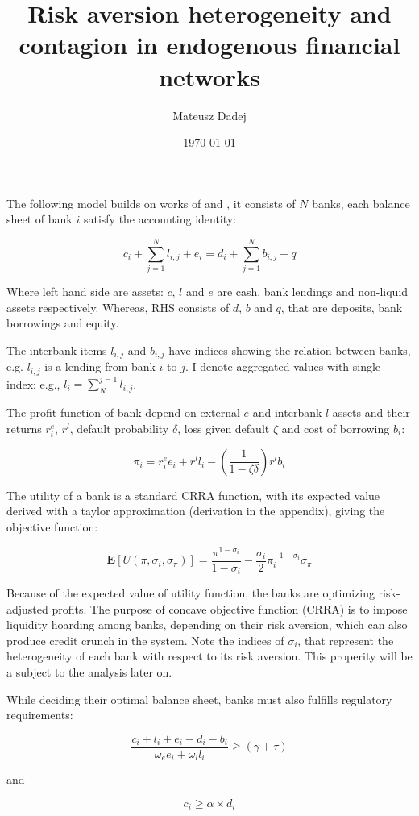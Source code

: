 \documentclass{article}
\title{Risk aversion heterogeneity and contagion in endogenous financial networks}
\author{Mateusz Dadej}
\date{\today}
\begin{document}
\maketitle


The following model builds on works of \citet{bluhm} and \citet{aldasoro}, it consists of $N$ banks, each balance sheet of bank $i$ satisfy the accounting identity:

\[c_i + \sum_{j=1}^{N}l_{i,j} + e_i = d_i + \sum_{j=1}^{N}b_{i,j} + q\]

Where left hand side are assets: $c$, $l$ and $e$ are cash, bank lendings and non-liquid assets respectively. Whereas, RHS consists of $d$, $b$ and $q$, that are deposits, bank borrowings and equity.

The interbank items $l_{i,j}$ and $b_{i,j}$  have indices showing the relation between banks, e.g. $l_{i,j}$ is a lending from bank $i$ to $j$. I denote aggregated values with single index: e.g., $l_{i} = \sum_{N}^{j=1} l_{i,j}$.

The profit function of bank depend on external $e$ and interbank $l$ assets and their returns $r^e_i$, $r^l$, default probability $\delta$, loss given default $\zeta$ and cost of borrowing $b_i$:

\[\pi_i = r_{i}^e e_i + r^l l_i - (\frac{1}{1 - \zeta \delta}) r^l b_i\]

The utility of a bank is a standard CRRA function, with its expected value derived with a taylor approximation (derivation in the appendix), giving the objective function:

\[\mathbf{E}[U(\pi, \sigma_i, \sigma_\pi)] = \frac{\pi^{1-\sigma_i}}{1 - \sigma_i} - \frac{\sigma_i}{2} \pi_i^{-1-\sigma_i} \sigma_\pi\]

Because of the expected value of utility function, the banks are optimizing risk-adjusted profits. The purpose of concave objective function (CRRA) is to impose liquidity hoarding among banks, depending on their risk aversion, which can also produce credit crunch in the system. Note the indices of $\sigma_i$, that represent the heterogeneity of each bank with respect to its risk aversion. This properity will be a subject to the analysis later on.

While deciding their optimal balance sheet, banks must also fulfills regulatory requirements:

\[\frac{c_i + l_i + e_i - d_i - b_i}{\omega_e e_i + \omega_l l_i} \geq (\gamma + \tau)\]

and

\[c_i \geq \alpha \times d_i\]
\end{document}
